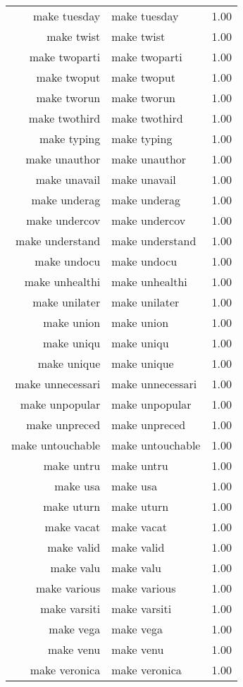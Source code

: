 \begin{table}[ht]
\begin{tabular}{rlr}
  make tuesday & make tuesday & 1.00 \\ 
  make twist & make twist & 1.00 \\ 
  make twoparti & make twoparti & 1.00 \\ 
  make twoput & make twoput & 1.00 \\ 
  make tworun & make tworun & 1.00 \\ 
  make twothird & make twothird & 1.00 \\ 
  make typing & make typing & 1.00 \\ 
  make unauthor & make unauthor & 1.00 \\ 
  make unavail & make unavail & 1.00 \\ 
  make underag & make underag & 1.00 \\ 
  make undercov & make undercov & 1.00 \\ 
  make understand & make understand & 1.00 \\ 
  make undocu & make undocu & 1.00 \\ 
  make unhealthi & make unhealthi & 1.00 \\ 
  make unilater & make unilater & 1.00 \\ 
  make union & make union & 1.00 \\ 
  make uniqu & make uniqu & 1.00 \\ 
  make unique & make unique & 1.00 \\ 
  make unnecessari & make unnecessari & 1.00 \\ 
  make unpopular & make unpopular & 1.00 \\ 
  make unpreced & make unpreced & 1.00 \\ 
  make untouchable & make untouchable & 1.00 \\ 
  make untru & make untru & 1.00 \\ 
  make usa & make usa & 1.00 \\ 
  make uturn & make uturn & 1.00 \\ 
  make vacat & make vacat & 1.00 \\ 
  make valid & make valid & 1.00 \\ 
  make valu & make valu & 1.00 \\ 
  make various & make various & 1.00 \\ 
  make varsiti & make varsiti & 1.00 \\ 
  make vega & make vega & 1.00 \\ 
  make venu & make venu & 1.00 \\ 
  make veronica & make veronica & 1.00 \\ 

\end{tabular}
\end{table}

